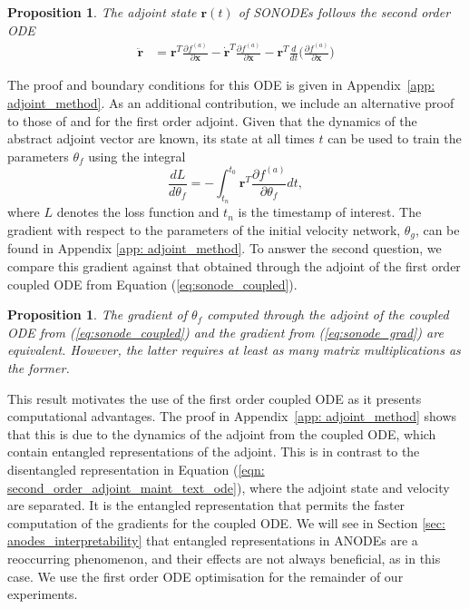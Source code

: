 \documentclass{article}
\newtheorem{proposition}[theorem]{Proposition}
\theoremstyle{remark}
\theoremstyle{definition}
\begin{document}
\begin{proposition}
\label{prop: second_order_adjoint}
The adjoint state $\mathbf{r}(t)$ of SONODEs follows the second order ODE
\begin{equation}
\label{eqn: second_order_adjoint_maint_text_ode}
\begin{aligned}
    \ddot{\mathbf{r}} &= \mathbf{r}^{T}\frac{\partial f^{(a)}}{\partial \mathbf{x}}
    -\dot{\mathbf{r}}^{T}\frac{\partial f^{(a)}}{\partial \dot{\mathbf{x}}}
    -\mathbf{r}^{T}\frac{d}{dt}\Biggr(\frac{\partial f^{(a)}}{\partial \dot{\mathbf{x}}}\Biggr)
\end{aligned}
\end{equation}
\end{proposition}

The proof and boundary conditions for this ODE is given in Appendix~\ref{app: adjoint_method}. As an additional contribution, we include an alternative proof to those of \citet{chen2018neural} and \citet{pontryagin2018mathematical} for the first order adjoint. Given that the dynamics of the abstract adjoint vector are known, its state at all times $t$ can be used to train the parameters $\theta_f$ using the integral
\begin{equation}
\label{eq:sonode_grad}
    \frac{dL}{d\theta_{f}} = -\int_{t_{n}}^{t_{0}}\mathbf{r}^{T}\frac{\partial f^{(a)}}{\partial \theta_{f}}dt,
\end{equation}
where $L$ denotes the loss function and $t_{n}$ is the timestamp of interest. The gradient with respect to the parameters of the initial velocity network, $\theta_g$, can be found in Appendix \ref{app: adjoint_method}. To answer the second question, we compare this gradient against that obtained through the adjoint of the first order coupled ODE from Equation (\ref{eq:sonode_coupled}). 

\begin{proposition}
\label{prop: adjoints_are_equivalent}
The gradient of $\theta_f$ computed through the adjoint of the coupled ODE from (\ref{eq:sonode_coupled}) and the gradient from (\ref{eq:sonode_grad}) are equivalent. However, the latter requires at least as many matrix multiplications as the former. 
\end{proposition}

This result motivates the use of the first order coupled ODE as it presents computational advantages. The proof in Appendix~\ref{app: adjoint_method} shows that this is due to the dynamics of the adjoint from the coupled ODE, which contain entangled representations of the adjoint. This is in contrast to the disentangled representation in Equation (\ref{eqn: second_order_adjoint_maint_text_ode}), where the adjoint state and velocity are separated. It is the entangled representation that permits the faster computation of the gradients for the coupled ODE. We will see in Section \ref{sec: anodes_interpretability} that entangled representations in ANODEs are a reoccurring phenomenon, and their effects are not always beneficial, as in this case. We use the first order ODE optimisation for the remainder of our experiments.
\end{document}
